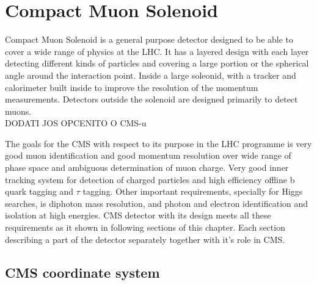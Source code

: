 \chapter{Compact Muon Solenoid} %

\label{Chapter4} %


Compact Muon Solenoid is a general purpose detector designed to be able to cover a wide range of physics at the LHC. It has a layered design with each layer detecting different kinds of particles and covering a large portion or the spherical angle around the interaction point. Inside a large soleonid, with a tracker and calorimeter built inside to improve the resolution of the momentum measurements. Detectors outside the solenoid are designed primarily to detect muons.  \\

DODATI JOS OPCENITO O CMS-u

\par The goals for the CMS with respect to its purpose in the LHC programme is very good muon identification and good momentum resolution over wide range of phase space and ambiguous determination of muon charge. Very good inner tracking system for detection of charged particles and high efficiency offline b quark tagging and $\tau$ tagging. Other important requirements, specially for Higgs searches, is diphoton mass resolution, and photon and electron identification and isolation at high energies. 
CMS detector with its design meets all these requirements as it shown in following sections of this chapter.  Each section describing a part of the detector separately together with it's role in CMS.  


\section{CMS coordinate system}

